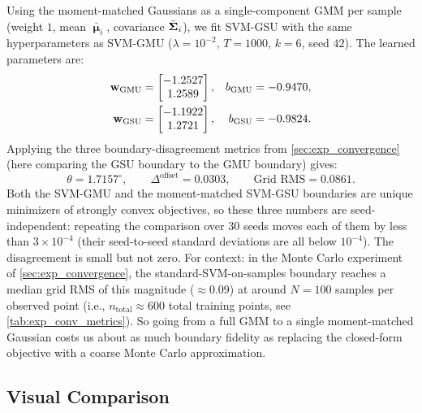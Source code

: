 \documentclass[11pt, letterpaper]{article}
\newcommand{\bSigma}{\vb{\Sigma}}
\newcommand{\bmu}{\boldsymbol{\upmu}}
\begin{document}
Using the moment-matched Gaussians as a single-component GMM per sample (weight $1$, mean $\bar{\bmu}_i$, covariance $\bar{\bSigma}_i$), we fit SVM-GSU with the same hyperparameters as SVM-GMU ($\lambda = 10^{-2}$, $T = 1000$, $k = 6$, seed $42$). The learned parameters are:
\begin{align}
    \vb{w}_{\text{GMU}} &= \begin{bmatrix} -1.2527 \\  1.2589 \end{bmatrix}, &
    b_{\text{GMU}} &= -0.9470, \label{eq:exp_gsu_vs_gmu_gmu}\\
    \vb{w}_{\text{GSU}} &= \begin{bmatrix} -1.1922 \\  1.2721 \end{bmatrix}, &
    b_{\text{GSU}} &= -0.9824. \label{eq:exp_gsu_vs_gmu_gsu}
\end{align}
Applying the three boundary-disagreement metrics from \cref{sec:exp_convergence} (here comparing the GSU boundary to the GMU boundary) gives:
\begin{equation}\label{eq:exp_gmu_gsu_metrics}
    \theta = 1.7157^{\circ},
    \qquad
    \Delta^{\text{offset}} = 0.0303,
    \qquad
    \text{Grid RMS} = 0.0861.
\end{equation}
Both the SVM-GMU and the moment-matched SVM-GSU boundaries are unique minimizers of strongly convex objectives, so these three numbers are seed-independent: repeating the comparison over $30$ seeds moves each of them by less than $3\times10^{-4}$ (their seed-to-seed standard deviations are all below $10^{-4}$). The disagreement is small but not zero. For context: in the Monte Carlo experiment of \cref{sec:exp_convergence}, the standard-SVM-on-samples boundary reaches a median grid RMS of this magnitude ($\approx 0.09$) at around $N = 100$ samples per observed point (i.e., $n_{\text{total}} \approx 600$ total training points, see \cref{tab:exp_conv_metrics}). So going from a full GMM to a single moment-matched Gaussian costs us about as much boundary fidelity as replacing the closed-form objective with a coarse Monte Carlo approximation.

\subsection{Visual Comparison}
\end{document}
